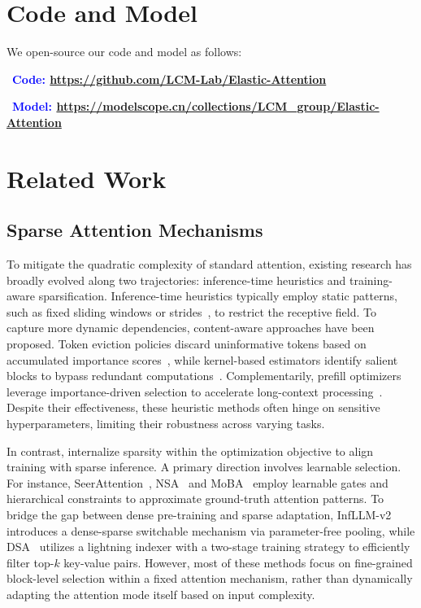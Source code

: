 \section{Code and Model}
We open-source our code and model as follows:

\faGithub\ \textbf{\textcolor{blue}{Code:} \href{https://github.com/LCM-Lab/Elastic-Attention}{https://github.com/LCM-Lab/Elastic-Attention}}

\faDatabase\ \textbf{\textcolor{blue}{Model:} \href{https://modelscope.cn/collections/LCM\_group/Elastic-Attention}{https://modelscope.cn/collections/LCM\_group/Elastic-Attention}}

\section{Related Work}
\label{sec:related_work}

\subsection{Sparse Attention Mechanisms}
\label{subsec:train_ssa}
To mitigate the quadratic complexity of standard attention, existing research has broadly evolved along two trajectories: inference-time heuristics and training-aware sparsification.
Inference-time heuristics typically employ static patterns, such as fixed sliding windows or strides~\citep{streamingllm, TriangleMix, Beltagy2020Longformer}, to restrict the receptive field. 
To capture more dynamic dependencies, content-aware approaches have been proposed. Token eviction policies discard uninformative tokens based on accumulated importance scores~\citep{h2o, snapkv, scissorhands}, while kernel-based estimators identify salient blocks to bypass redundant computations~\citep{jiang2024minference}. 
Complementarily, prefill optimizers leverage importance-driven selection to accelerate long-context processing~\citep{flexprefill, xattention, spargeattn, peng2025acceleratingprefillinglongcontextllms, ji2025salelowbitestimation}. Despite their effectiveness, these heuristic methods often hinge on sensitive hyperparameters, limiting their robustness across varying tasks.

In contrast, internalize sparsity within the optimization objective to align training with sparse inference.
A primary direction involves learnable selection. For instance, SeerAttention~\citep{gao2024seerattention}, NSA~\citep{NSA} and MoBA~\citep{moba} employ learnable gates and hierarchical constraints to approximate ground-truth attention patterns. 
To bridge the gap between dense pre-training and sparse adaptation, InfLLM-v2~\citep{infllmv2} introduces a dense-sparse switchable mechanism via parameter-free pooling, while DSA~\citep{deepseekai2024deepseekv32} utilizes a lightning indexer with a two-stage training strategy to efficiently filter top-$k$ key-value pairs.
However, most of these methods focus on fine-grained block-level selection within a fixed attention mechanism, rather than dynamically adapting the attention mode itself based on input complexity.

